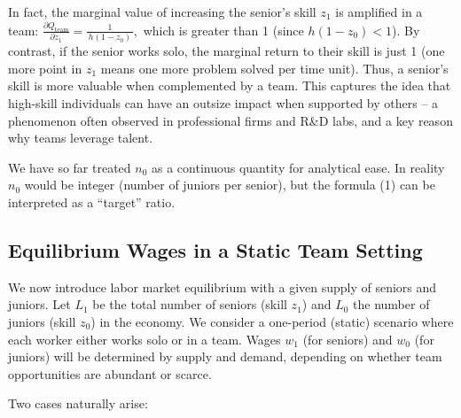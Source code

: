 \documentclass[12pt]{article}
\begin{document}
In fact, the marginal value of increasing the senior's skill \(z_1\) is
amplified in a team:
\(\frac{\partial Q_{\text{team}}}{\partial z_1} = \frac{1}{\,h(1-z_0)\,},\)
which is greater than 1 (since \(h(1-z_0)<1\)). By contrast, if the
senior works {solo}, the marginal return to their skill is just 1
(one more point in \(z_1\) means one more problem solved per time unit).
{Thus, a senior's skill is more valuable when complemented by a
team}. This captures the idea that high-skill individuals can have an
outsize impact when supported by others -- a phenomenon often observed
in professional firms and R\&D labs, and a key reason why {teams
leverage talent}.

We have so far treated \(n_0\) as a continuous quantity for analytical
ease. In reality \(n_0\) would be integer (number of juniors per
senior), but the formula (1) can be interpreted as a ``target'' ratio.

\subsection{Equilibrium Wages in a Static Team
Setting}\label{equilibrium-wages-in-a-static-team-setting}

We now introduce {labor market equilibrium} with a given supply
of seniors and juniors. Let \(L_1\) be the total number of seniors
(skill \(z_1\)) and \(L_0\) the number of juniors (skill \(z_0\)) in the
economy. We consider a one-period (static) scenario where each worker
either works solo or in a team. Wages \(w_1\) (for seniors) and \(w_0\)
(for juniors) will be determined by supply and demand, depending on
whether team opportunities are abundant or scarce.

Two cases naturally arise:
\end{document}
